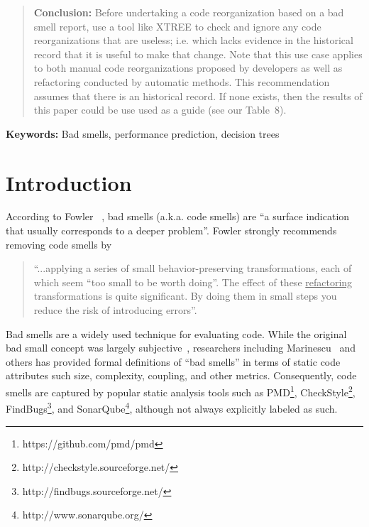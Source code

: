 \documentclass[twocolumn,5p]{elsarticle}
\theoremstyle{break}
\begin{document}
\begin{frontmatter}
\begin{abstract}
			\noindent
			{\bf Conclusion: }
			Before undertaking a code reorganization based on a bad smell report,
			use a tool like XTREE to check and ignore any code reorganizations   that  are useless; i.e. which lacks evidence
			in the historical record  that it is useful to make that change.
			Note that this use case applies to both manual code reorganizations proposed by developers
			as well as refactoring  conducted by automatic methods.
			This recommendation assumes that there is an historical record.
			If none exists, then the results of this paper could be use used as a guide (see our
			Table~8). 
			
			
		\end{abstract}
	\end{frontmatter}
	
	\vspace{1mm}
	\noindent
	{\bf Keywords:} Bad smells,
	performance prediction,  decision trees 
	
	
	
	
	\section{Introduction}
	
	According to   Fowler ~\cite{fowler99}, bad smells (a.k.a. code smells)
	are ``a surface indication that usually corresponds to a deeper problem''.
	Fowler strongly recommends   removing   code smells   by
	\begin{quote}
		``...applying a series of small behavior-preserving transformations, each 
		of which seem ``too small to be worth doing''. 
		The  effect of   these \underline{refactoring} transformations is quite significant. By doing them in small steps you reduce the risk 
		of introducing errors''.
	\end{quote}
	
	Bad smells are a widely used technique for evaluating code. While the original bad small concept was largely subjective~\cite{fowler99}, researchers including Marinescu~\cite{marinescu06} and others has provided formal definitions of ``bad smells'' in terms of static code attributes such size, complexity, coupling, and other metrics. Consequently, code smells are captured by popular static analysis tools such as PMD\footnote{https://github.com/pmd/pmd}, CheckStyle\footnote{http://checkstyle.sourceforge.net/}, FindBugs\footnote{http://findbugs.sourceforge.net/}, and SonarQube\footnote{http://www.sonarqube.org/}, although not always explicitly labeled as such. 
	
\end{document}
